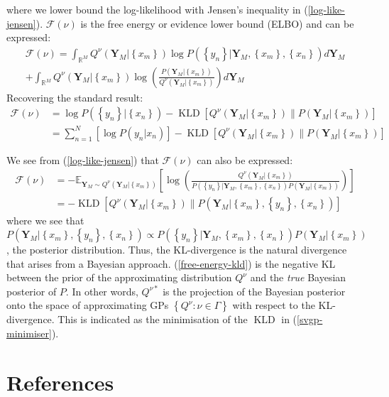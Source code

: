 \documentclass[twoside,11pt]{article}
\newcommand{\KLD}{\operatorname{KLD}}
\begin{document}
where we lower bound the log-likelihood with Jensen's inequality in (\ref{log-like-jensen}). $\mathcal{F(\nu)}$ is the free energy or evidence lower bound (ELBO) and can be expressed:
\begin{multline}
    \mathcal{F(\nu)} = \int_{\mathbb{R}^M} Q^{\nu}\left(\mathbf{Y}_M \big\vert \left\{ x_m\right\} \right) \log P\left(\left\{ y_n\right\} \big\vert \mathbf{Y}_M , \left\{ x_m\right\}, \left\{ x_n\right\}\right)d\mathbf{Y}_M 
    \\ + \int_{\mathbb{R}^M} Q^{\nu}\left(\mathbf{Y}_M \big\vert \left\{ x_m\right\} \right) \log \left(\frac{P\left(\mathbf{Y}_M \big\vert \left\{ x_m\right\}\right)}{Q^{\nu}\left(\mathbf{Y}_M \big\vert \left\{ x_m\right\} \right)} \right)d\mathbf{Y}_M
\end{multline}
Recovering the standard result:
\begin{align}
    \mathcal{F(\nu)} &=  \log P\left(\left\{ y_n\right\} \big\vert \left\{ x_n\right\}\right) - \KLD\left[Q^{\nu}\left(\mathbf{Y}_M \big\vert \left\{ x_m\right\} \right) \| P\left(\mathbf{Y}_M \big\vert \left\{ x_m\right\} \right)\right]
    \\ &= \sum_{n=1}^N \left[\log P \left(y_n \big\vert  x_n \right)\right] - \KLD\left[Q^{\nu}\left(\mathbf{Y}_M \vert \left\{ x_m\right\} \right) \| P\left(\mathbf{Y}_M \big\vert \left\{ x_m\right\} \right)\right]
\end{align}

We see from (\ref{log-like-jensen}) that $\mathcal{F(\nu)}$ can also be expressed:
\begin{align}
    \mathcal{F(\nu)} &= - \mathbb{E}_{\mathbf{Y}_M \sim Q^{\nu}\left(\mathbf{Y}_M \big\vert \left\{ x_m\right\} \right)} \left[\log \left(\frac{Q^{\nu}\left(\mathbf{Y}_M \big\vert \left\{ x_m\right\} \right)}{P\left(\left\{ y_n\right\} \big\vert \mathbf{Y}_M , \left\{ x_m\right\}, \left\{ x_n\right\}\right)P\left(\mathbf{Y}_M \big\vert \left\{ x_m\right\}\right)} \right) \right]\\
    &= -\KLD \left[Q^{\nu}\left(\mathbf{Y}_M \big\vert \left\{ x_m\right\} \right) \| P\left(\mathbf{Y}_M \big\vert \left\{ x_m\right\}, \left\{ y_n\right\}, \left\{ x_n\right\}\right) \right]
    \label{free-energy-kld}
\end{align}
where we see that $P\left(\mathbf{Y}_M \big\vert \left\{ x_m\right\}, \left\{ y_n\right\}, \left\{ x_n\right\}\right) \propto P\left(\left\{ y_n\right\} \big\vert \mathbf{Y}_M , \left\{ x_m\right\}, \left\{ x_n\right\}\right)P\left(\mathbf{Y}_M \big\vert \left\{ x_m\right\}\right)$, the posterior distribution.
Thus, the KL-divergence is the natural divergence that arises from a Bayesian approach. (\ref{free-energy-kld}) is the negative KL between the prior of the approximating distribution $Q^{\nu}$ and the \textit{true} Bayesian posterior of $P$. In other words, $Q^{\nu*}$ is the projection of the Bayesian posterior onto the space of approximating GPs $\left\{Q^{\nu}: \nu \in \Gamma\right\}$ with respect to the KL-divergence. This is indicated as the minimisation of the $\KLD$ in (\ref{svgp-minimiser}).

\begingroup
\let\clearpage\relax
\AtNextBibliography{\small}
\section*{References}
\printbibliography[heading=talikarng, title = {References}]
\endgroup
\end{document}
